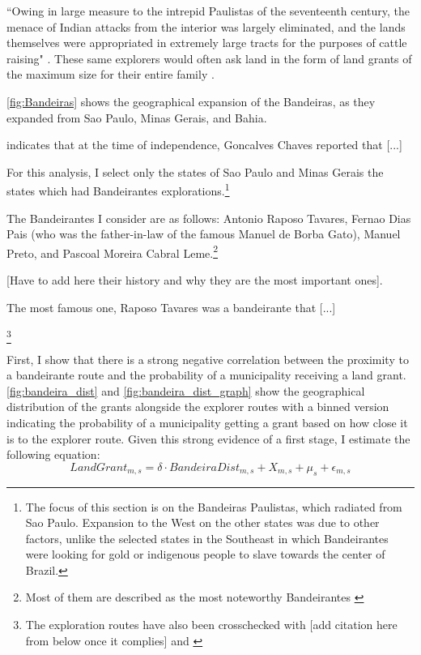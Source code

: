 \documentclass{article}
\begin{document}
``Owing in large measure to the intrepid Paulistas of the seventeenth century, the menace of Indian attacks from the interior was largely eliminated, and the lands themselves were appropriated in extremely large tracts for the purposes of cattle raising" \parencite[p.~320]{Smith1972-dv}. 
These same explorers would often ask land in the form of land grants of the maximum size for their entire family \parencite[p.~320]{Smith1972-dv}.

\autoref{fig:Bandeiras} shows the geographical expansion of the Bandeiras, as they expanded from Sao Paulo, Minas Gerais, and Bahia.


\textcite[p.~44]{Lima1954-td} indicates that at the time of independence, Goncalves Chaves reported that [...]

For this analysis, I select only the states of Sao Paulo and Minas Gerais the states which had Bandeirantes explorations.\footnote{The focus of this section is on the Bandeiras Paulistas, which radiated from Sao Paulo. Expansion to the West on the other states was due to other factors, unlike the selected states in the Southeast in which Bandeirantes were looking for gold or indigenous people to slave towards the center of Brazil.}

The Bandeirantes I consider are as follows: Antonio Raposo Tavares, Fernao Dias Pais (who was the father-in-law of the famous Manuel de Borba Gato), Manuel Preto, and Pascoal Moreira Cabral Leme.\footnote{Most of them are described as the most noteworthy Bandeirantes \parencite[p.~43]{Prestes_Filho2012-dp}}

[Have to add here their history and why they are the most important ones].

The most famous one, Raposo Tavares was a bandeirante that [...] 
\parencite{Franco1954-bk}

\footnote{The exploration routes have also been crosschecked with [add citation here from below once it complies] and \textcite{Santos2022-rv}}

First, I show that there is a strong negative correlation between the proximity to a bandeirante route and the probability of a municipality receiving a land grant. 
\autoref{fig:bandeira_dist} and \autoref{fig:bandeira_dist_graph} show the geographical distribution of the grants alongside the explorer routes with a binned version indicating the probability of a municipality getting a grant based on how close it is to the explorer route. 
Given this strong evidence of a first stage, I estimate the following equation:
\begin{equation}
  \label{eqn:firststage}
  LandGrant_{m,s} = \delta \cdot BandeiraDist_{m,s} +  X_{m,s} + \mu_s  + \epsilon_{m,s}
\end{equation}
\end{document}
